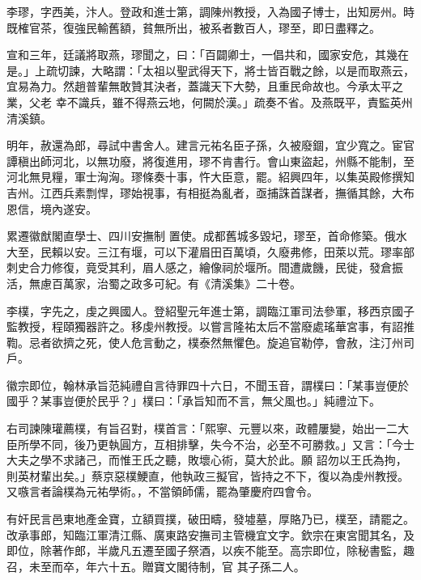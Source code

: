 \begin{pinyinscope}
 李璆，字西美，汴人。登政和進士第，調陳州教授，入為國子博士，出知房州。時既榷官茶，復強民輸舊額，貧無所出，被系者數百人，璆至，即日盡釋之。



 宣和三年，廷議將取燕，璆聞之，曰：「百闢卿士，一倡共和，國家安危，其幾在是。」上疏切諫，大略謂：「太祖以聖武得天下，將士皆百戰之餘，以是而取燕云，宜易為力。然趙普輩無敢贊其決者，蓋識天下大勢，且重民命故也。今承太平之業，父老
 幸不識兵，雖不得燕云地，何闕於漢。」疏奏不省。及燕既平，責監英州清溪鎮。



 明年，赦還為郎，尋試中書舍人。建言元祐名臣子孫，久被廢錮，宜少寬之。宦官譚稹出師河北，以無功廢，將復進用，璆不肯書行。會山東盜起，州縣不能制，至河北無見糧，軍士洶洶。璆條奏十事，忤大臣意，罷。紹興四年，以集英殿修撰知吉州。江西兵素剽悍，璆始視事，有相挺為亂者，亟捕誅首謀者，撫循其餘，大布恩信，境內遂安。



 累遷徽猷閣直學士、四川安撫制
 置使。成都舊城多毀圮，璆至，首命修築。俄水大至，民賴以安。三江有堰，可以下灌眉田百萬頃，久廢弗修，田萊以荒。璆率部刺史合力修復，竟受其利，眉人感之，繪像祠於堰所。間遭歲饑，民徙，發倉振活，無慮百萬家，治蜀之政多可紀。有《清溪集》二十卷。



 李樸，字先之，虔之興國人。登紹聖元年進士第，調臨江軍司法參軍，移西京國子監教授，程頤獨器許之。移虔州教授。以嘗言隆祐太后不當廢處瑤華宮事，有詔推
 鞫。忌者欲擠之死，使人危言動之，樸泰然無懼色。旋追官勒停，會赦，注汀州司戶。



 徽宗即位，翰林承旨范純禮自言待罪四十六日，不聞玉音，謂樸曰：「某事豈便於國乎？某事豈便於民乎？」樸曰：「承旨知而不言，無父風也。」純禮泣下。



 右司諫陳瓘薦樸，有旨召對，樸首言：「熙寧、元豐以來，政體屢變，始出一二大臣所學不同，後乃更執圓方，互相排擊，失今不治，必至不可勝救。」又言：「今士大夫之學不求諸己，而惟王氏之聽，敗壞心術，莫大於此。願
 詔勿以王氏為拘，則英材輩出矣。」蔡京惡樸鯁直，他執政三擬官，皆持之不下，復以為虔州教授。又嗾言者論樸為元祐學術。，不當領師儒，罷為肇慶府四會令。



 有奸民言邑東地產金寶，立額買撲，破田疇，發墟墓，厚賂乃已，樸至，請罷之。改承事郎，知臨江軍清江縣、廣東路安撫司主管機宜文字。欽宗在東宮聞其名，及即位，除著作郎，半歲凡五遷至國子祭酒，以疾不能至。高宗即位，除秘書監，趣召，未至而卒，年六十五。贈寶文閣待制，官
 其子孫二人。




\end{pinyinscope}
